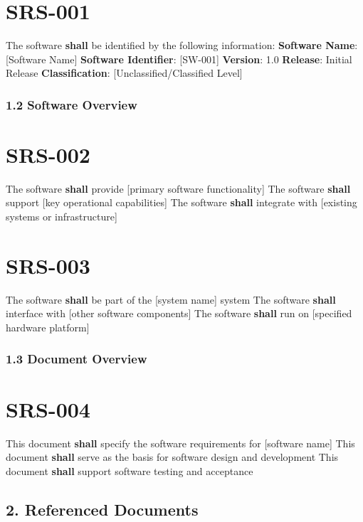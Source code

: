 \section{SRS-001}\label{SRS-001}

The software \textbf{shall} be identified by the following information:
\textbf{Software Name}: [Software Name]
\textbf{Software Identifier}: [SW-001]
\textbf{Version}: 1.0
\textbf{Release}: Initial Release
\textbf{Classification}: [Unclassified/Classified Level]

\subsubsection{1.2 Software Overview}

\section{SRS-002}\label{SRS-002}

The software \textbf{shall} provide [primary software functionality]
The software \textbf{shall} support [key operational capabilities]
The software \textbf{shall} integrate with [existing systems or infrastructure]

\section{SRS-003}\label{SRS-003}

The software \textbf{shall} be part of the [system name] system
The software \textbf{shall} interface with [other software components]
The software \textbf{shall} run on [specified hardware platform]

\subsubsection{1.3 Document Overview}

\section{SRS-004}\label{SRS-004}

This document \textbf{shall} specify the software requirements for [software name]
This document \textbf{shall} serve as the basis for software design and development
This document \textbf{shall} support software testing and acceptance

\subsection{2. Referenced Documents}

